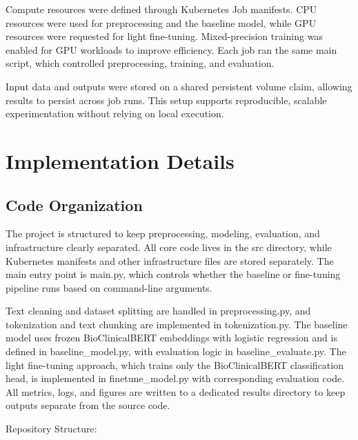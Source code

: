 \documentclass[11pt]{article}
\begin{document}
Compute resources were defined through Kubernetes Job manifests. CPU resources were used for preprocessing and the baseline model, while GPU resources were requested for light fine-tuning. Mixed-precision training was enabled for GPU workloads to improve efficiency. Each job ran the same main script, which controlled preprocessing, training, and evaluation.

Input data and outputs were stored on a shared persistent volume claim, allowing results to persist across job runs. This setup supports reproducible, scalable experimentation without relying on local execution.

\section{Implementation Details}

\subsection{Code Organization}

The project is structured to keep preprocessing, modeling, evaluation, and infrastructure clearly separated. All core code lives in the src directory, while Kubernetes manifests and other infrastructure files are stored separately. The main entry point is main.py, which controls whether the baseline or fine-tuning pipeline runs based on command-line arguments.

Text cleaning and dataset splitting are handled in preprocessing.py, and tokenization and text chunking are implemented in tokenization.py. The baseline model uses frozen BioClinicalBERT embeddings with logistic regression and is defined in baseline\_model.py, with evaluation logic in baseline\_evaluate.py. The light fine-tuning approach, which trains only the BioClinicalBERT classification head, is implemented in finetune\_model.py with corresponding evaluation code. All metrics, logs, and figures are written to a dedicated results directory to keep outputs separate from the source code.

\vspace{1em}
\noindent Repository Structure:
\end{document}
